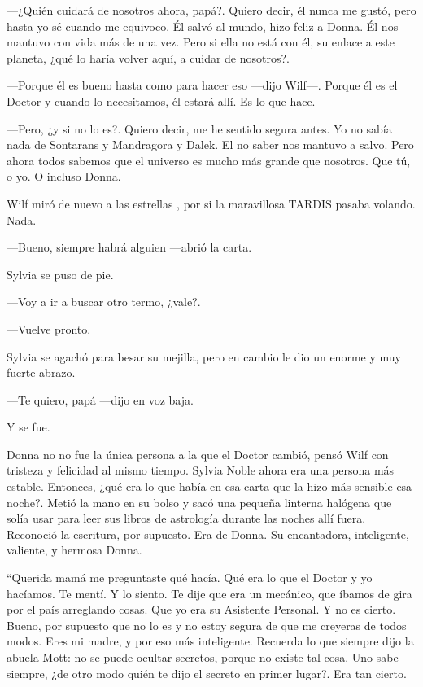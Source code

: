 ---¿Quién cuidará de nosotros ahora, papá?. Quiero decir, él nunca me
gustó, pero hasta yo sé cuando me equivoco. Él salvó al mundo, hizo
feliz a Donna. Él nos mantuvo con vida más de una vez. Pero si ella no
está con él, su enlace a este planeta, ¿qué lo haría volver aquí, a
cuidar de nosotros?.

---Porque él es bueno hasta como para hacer eso ---dijo Wilf---. Porque
él es el Doctor y cuando lo necesitamos, él estará allí. Es lo que hace.

---Pero, ¿y si no lo es?. Quiero decir, me he sentido segura antes. Yo
no sabía nada de Sontarans y Mandragora y Dalek. El no saber nos mantuvo
a salvo. Pero ahora todos sabemos que el universo es mucho más grande
que nosotros. Que tú, o yo. O incluso Donna.

Wilf miró de nuevo a las estrellas , por si la maravillosa TARDIS pasaba
volando. Nada.

---Bueno, siempre habrá alguien ---abrió la carta.

Sylvia se puso de pie.

---Voy a ir a buscar otro termo, ¿vale?.

---Vuelve pronto.

Sylvia se agachó para besar su mejilla, pero en cambio le dio un enorme
y muy fuerte abrazo.

---Te quiero, papá ---dijo en voz baja.

Y se fue.

Donna no no fue la única persona a la que el Doctor cambió, pensó Wilf
con tristeza y felicidad al mismo tiempo. Sylvia Noble ahora era una
persona más estable. Entonces, ¿qué era lo que había en esa carta que la
hizo más sensible esa noche?. Metió la mano en su bolso y sacó una
pequeña linterna halógena que solía usar para leer sus libros de
astrología durante las noches allí fuera. Reconoció la escritura, por
supuesto. Era de Donna. Su encantadora, inteligente, valiente, y hermosa
Donna.

``Querida mamá me preguntaste qué hacía. Qué era lo que el Doctor y yo
hacíamos. Te mentí. Y lo siento. Te dije que era un mecánico, que íbamos
de gira por el país arreglando cosas. Que yo era su Asistente Personal.
Y no es cierto. Bueno, por supuesto que no lo es y no estoy segura de
que me creyeras de todos modos. Eres mi madre, y por eso más
inteligente. Recuerda lo que siempre dijo la abuela Mott: no se puede
ocultar secretos, porque no existe tal cosa. Uno sabe siempre, ¿de otro
modo quién te dijo el secreto en primer lugar?. Era tan cierto.

